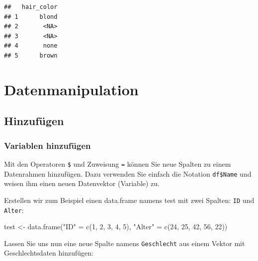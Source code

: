 \documentclass[
]{book}
\newenvironment{Shaded}{\begin{snugshade}}{\end{snugshade}}
\newcommand{\DecValTok}[1]{\textcolor[rgb]{0.00,0.00,0.81}{#1}}
\newcommand{\FunctionTok}[1]{\textcolor[rgb]{0.00,0.00,0.00}{#1}}
\newcommand{\NormalTok}[1]{#1}
\newcommand{\OtherTok}[1]{\textcolor[rgb]{0.56,0.35,0.01}{#1}}
\newcommand{\SpecialCharTok}[1]{\textcolor[rgb]{0.00,0.00,0.00}{#1}}
\newcommand{\StringTok}[1]{\textcolor[rgb]{0.31,0.60,0.02}{#1}}
\begin{document}
\begin{verbatim}
##   hair_color
## 1      blond
## 2       <NA>
## 3       <NA>
## 4       none
## 5      brown
\end{verbatim}

\hypertarget{datenmanipulation}{%
\chapter{Datenmanipulation}\label{datenmanipulation}}

\hypertarget{hinzufuxfcgen}{%
\section{Hinzufügen}\label{hinzufuxfcgen}}

\hypertarget{variablen-hinzufuxfcgen}{%
\subsection{Variablen hinzufügen}\label{variablen-hinzufuxfcgen}}

Mit den Operatoren \texttt{\$} und Zuweisung \texttt{=} können Sie neue Spalten zu einem Datenrahmen hinzufügen. Dazu verwenden Sie einfach die Notation \texttt{df\$Name} und weisen ihm einen neuen Datenvektor (Variable) zu.

Erstellen wir zum Beispiel einen data.frame namens test mit zwei Spalten: \texttt{ID} und \texttt{Alter}:

\begin{Shaded}
\begin{Highlighting}[]
\NormalTok{test }\OtherTok{\textless{}{-}} \FunctionTok{data.frame}\NormalTok{(}\StringTok{"ID"} \OtherTok{=} \FunctionTok{c}\NormalTok{(}\DecValTok{1}\NormalTok{, }\DecValTok{2}\NormalTok{, }\DecValTok{3}\NormalTok{, }\DecValTok{4}\NormalTok{, }\DecValTok{5}\NormalTok{),}
                     \StringTok{"Alter"} \OtherTok{=} \FunctionTok{c}\NormalTok{(}\DecValTok{24}\NormalTok{, }\DecValTok{25}\NormalTok{, }\DecValTok{42}\NormalTok{, }\DecValTok{56}\NormalTok{, }\DecValTok{22}\NormalTok{))}
\end{Highlighting}
\end{Shaded}

Lassen Sie uns nun eine neue Spalte namens \texttt{Geschlecht} aus einem Vektor mit Geschlechtsdaten hinzufügen:

\begin{Shaded}
\end{Shaded}
\end{document}
